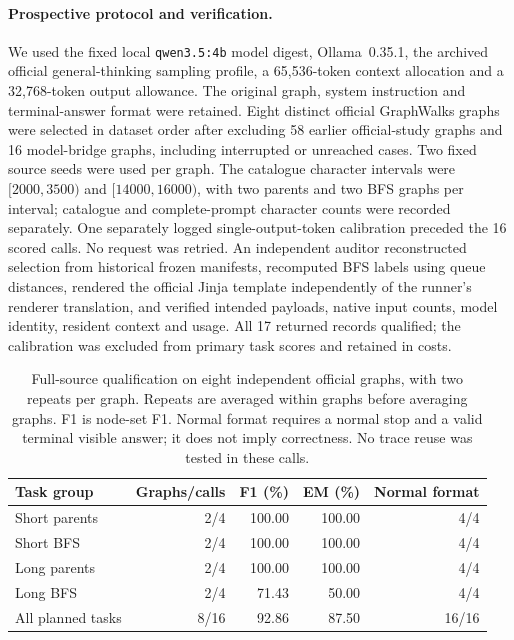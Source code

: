 \documentclass[10pt]{article}
\begin{document}
\paragraph{Prospective protocol and verification.} We used the fixed local \texttt{qwen3.5:4b} model digest, Ollama~0.35.1, the archived official general-thinking sampling profile, a 65,536-token context allocation and a 32,768-token output allowance. The original graph, system instruction and terminal-answer format were retained. Eight distinct official GraphWalks graphs were selected in dataset order after excluding 58 earlier official-study graphs and 16 model-bridge graphs, including interrupted or unreached cases. Two fixed source seeds were used per graph. The catalogue character intervals were $[2000,3500)$ and $[14000,16000)$, with two parents and two BFS graphs per interval; catalogue and complete-prompt character counts were recorded separately. One separately logged single-output-token calibration preceded the 16 scored calls. No request was retried. An independent auditor reconstructed selection from historical frozen manifests, recomputed BFS labels using queue distances, rendered the official Jinja template independently of the runner's renderer translation, and verified intended payloads, native input counts, model identity, resident context and usage. All 17 returned records qualified; the calibration was excluded from primary task scores and retained in costs.

\begin{table}[htbp]
\centering
\caption{Full-source qualification on eight independent official graphs, with two repeats per graph. Repeats are averaged within graphs before averaging graphs. F1 is node-set F1. Normal format requires a normal stop and a valid terminal visible answer; it does not imply correctness. No trace reuse was tested in these calls.}
\label{tab:hybrid-source}
\begin{tabular}{lrrrr}
\toprule
Task group & Graphs/calls & F1 (\%) & EM (\%) & Normal format \\
\midrule
Short parents & 2/4 & 100.00 & 100.00 & 4/4 \\
Short BFS & 2/4 & 100.00 & 100.00 & 4/4 \\
Long parents & 2/4 & 100.00 & 100.00 & 4/4 \\
Long BFS & 2/4 & 71.43 & 50.00 & 4/4 \\
All planned tasks & 8/16 & 92.86 & 87.50 & 16/16 \\
\bottomrule
\end{tabular}
\end{table}
\end{document}
